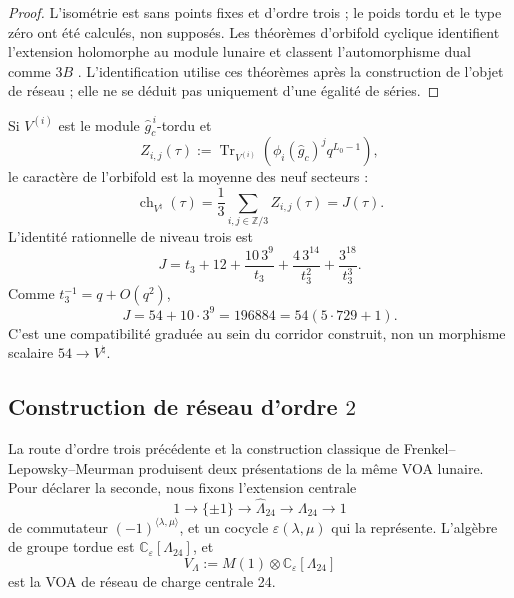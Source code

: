 \begin{proof}
L'isométrie est sans points fixes et d'ordre trois ; le poids tordu et le type zéro ont été
calculés, non supposés. Les théorèmes d'orbifold cyclique identifient
l'extension holomorphe au module lunaire et classent l'automorphisme dual
comme \(3B\)
\cite{ChenLamShimakura2016,AbeLamYamada2017,Carnahan2017}.
L'identification utilise ces théorèmes après la construction de l'objet de réseau ;
elle ne se déduit pas uniquement d'une égalité de séries.
\end{proof}

Si \(V^{(i)}\) est le module \(\widehat g_c^{\,i}\)-tordu et
\[
 Z_{i,j}(\tau):=
 \operatorname{Tr}_{V^{(i)}}\!
 \left(
 \phi_i(\widehat g_c)^j q^{L_0-1}
 \right),
\]
le caractère de l'orbifold est la moyenne des neuf secteurs :
\begin{equation}
 \operatorname{ch}_{V^\natural}(\tau)
 =\frac13\sum_{i,j\in\mathbb Z/3}Z_{i,j}(\tau)
 =J(\tau).
 \label{p12-83-c20-s8:eq:promedio-nueve-sectores-u031}
\end{equation}
L'identité rationnelle de niveau trois est
\begin{equation}
 J
 =t_3+12+\frac{10\,3^9}{t_3}
 +\frac{4\,3^{14}}{t_3^2}
 +\frac{3^{18}}{t_3^3}.
 \label{p12-83-c20-s8:eq:j-desde-t3-u031}
\end{equation}
Comme \(t_3^{-1}=q+O(q^2)\),
\begin{equation}
 [q]J=54+10\cdot3^9=196884
 =54(5\cdot729+1).
 \label{p12-83-c20-s8:eq:coeficiente-196884-u031}
\end{equation}
C'est une compatibilité graduée au sein du corridor construit, non un
morphisme scalaire \(54\to V^\natural\).

\subsection{Construction de réseau d'ordre \(2\)}

La route d'ordre trois précédente et la construction classique de
Frenkel--Lepowsky--Meurman produisent deux présentations de la même VOA lunaire.
Pour déclarer la seconde, nous fixons l'extension centrale
\begin{equation}
 1\longrightarrow\{\pm1\}
 \longrightarrow\widehat\Lambda_{24}
 \longrightarrow\Lambda_{24}
 \longrightarrow1
 \label{p12-83-c20-s8:eq:extension-central-leech-u031}
\end{equation}
de commutateur
\((-1)^{\langle\lambda,\mu\rangle}\), et un cocycle
\(\varepsilon(\lambda,\mu)\) qui la représente. L'algèbre de groupe
tordue est \(\mathbb C_\varepsilon[\Lambda_{24}]\), et
\begin{equation}
 V_\Lambda
 :=M(1)\otimes\mathbb C_\varepsilon[\Lambda_{24}]
 \label{p12-83-c20-s8:eq:voa-reticular-leech-u031}
\end{equation}
est la VOA de réseau de charge centrale 24.

